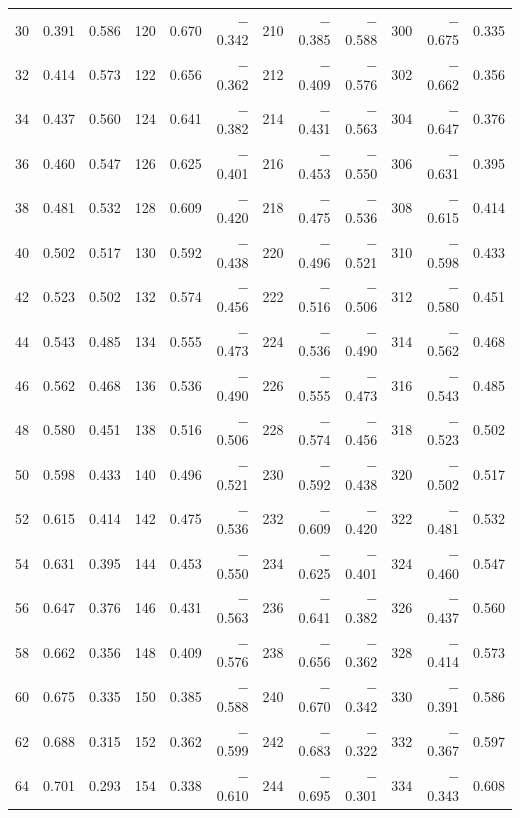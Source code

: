 \begin{table}[!h]
{\begin{tabular}{rrr|rrr|rrr|rrr}
 30 &   0.391 &  0.586 & 120 &   0.670 & $-$0.342 & 210 &  $-$0.385 & $-$0.588 & 300 &  $-$0.675 &  0.335\\
 32 &   0.414 &  0.573 & 122 &   0.656 & $-$0.362 & 212 &  $-$0.409 & $-$0.576 & 302 &  $-$0.662 &  0.356\\
 34 &   0.437 &  0.560 & 124 &   0.641 & $-$0.382 & 214 &  $-$0.431 & $-$0.563 & 304 &  $-$0.647 &  0.376\\
 36 &   0.460 &  0.547 & 126 &   0.625 & $-$0.401 & 216 &  $-$0.453 & $-$0.550 & 306 &  $-$0.631 &  0.395\\
 38 &   0.481 &  0.532 & 128 &   0.609 & $-$0.420 & 218 &  $-$0.475 & $-$0.536 & 308 &  $-$0.615 &  0.414\\
 40 &   0.502 &  0.517 & 130 &   0.592 & $-$0.438 & 220 &  $-$0.496 & $-$0.521 & 310 &  $-$0.598 &  0.433\\
 42 &   0.523 &  0.502 & 132 &   0.574 & $-$0.456 & 222 &  $-$0.516 & $-$0.506 & 312 &  $-$0.580 &  0.451\\
 44 &   0.543 &  0.485 & 134 &   0.555 & $-$0.473 & 224 &  $-$0.536 & $-$0.490 & 314 &  $-$0.562 &  0.468\\
 46 &   0.562 &  0.468 & 136 &   0.536 & $-$0.490 & 226 &  $-$0.555 & $-$0.473 & 316 &  $-$0.543 &  0.485\\
 48 &   0.580 &  0.451 & 138 &   0.516 & $-$0.506 & 228 &  $-$0.574 & $-$0.456 & 318 &  $-$0.523 &  0.502\\
 50 &   0.598 &  0.433 & 140 &   0.496 & $-$0.521 & 230 &  $-$0.592 & $-$0.438 & 320 &  $-$0.502 &  0.517\\
 52 &   0.615 &  0.414 & 142 &   0.475 & $-$0.536 & 232 &  $-$0.609 & $-$0.420 & 322 &  $-$0.481 &  0.532\\
 54 &   0.631 &  0.395 & 144 &   0.453 & $-$0.550 & 234 &  $-$0.625 & $-$0.401 & 324 &  $-$0.460 &  0.547\\
 56 &   0.647 &  0.376 & 146 &   0.431 & $-$0.563 & 236 &  $-$0.641 & $-$0.382 & 326 &  $-$0.437 &  0.560\\
 58 &   0.662 &  0.356 & 148 &   0.409 & $-$0.576 & 238 &  $-$0.656 & $-$0.362 & 328 &  $-$0.414 &  0.573\\
 60 &   0.675 &  0.335 & 150 &   0.385 & $-$0.588 & 240 &  $-$0.670 & $-$0.342 & 330 &  $-$0.391 &  0.586\\
 62 &   0.688 &  0.315 & 152 &   0.362 & $-$0.599 & 242 &  $-$0.683 & $-$0.322 & 332 &  $-$0.367 &  0.597\\
 64 &   0.701 &  0.293 & 154 &   0.338 & $-$0.610 & 244 &  $-$0.695 & $-$0.301 & 334 &  $-$0.343 &  0.608\\

\end{tabular}}
\end{table}
